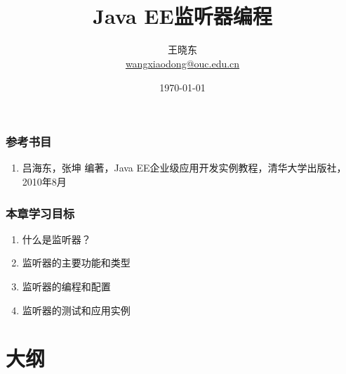 
\title[KevinW@OUC]{\\  
Java EE监听器编程}
\author[王晓东]{王晓东\\
  \href{mailto:wangxiaodong@ouc.edu.cn}{\footnotesize wangxiaodong@ouc.edu.cn}}
\date{\today}


 \frame{\titlepage}

\begin{frame}
\frametitle{参考书目}
\begin{enumerate}
\item 吕海东，张坤 编著，Java EE企业级应用开发实例教程，清华大学出版社，2010年8月
\end{enumerate}  
\end{frame}

 \begin{frame}
 \frametitle{本章学习目标}
 \begin{enumerate}
 \item 什么是监听器？
 \item 监听器的主要功能和类型
 \item 监听器的编程和配置
 \item 监听器的测试和应用实例
 \end{enumerate}  
 \end{frame}

\section*{大纲}

